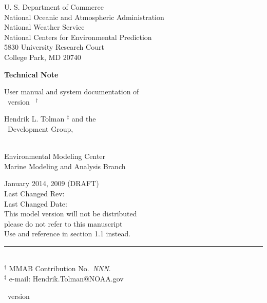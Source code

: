 
\pagestyle{empty}

\begin{center} 
U. S. Department of Commerce \\
National Oceanic and Atmospheric Administration \\
National Weather Service \\
National Centers for Environmental Prediction \\
5830 University Research Court \\
College Park, MD 20740


\vspace{15mm}

{\bf Technical Note}

\vspace{15mm}

{\large User manual and system documentation of \\
\ww\ version \WWver\ $^\dag$} \\

\vspace{15mm}

Hendrik L. Tolman $^\ddag$ and the \\
\ww\ Development Group, \\
\strut \\
Environmental Modeling Center \\
Marine Modeling and Analysis Branch

\vfill

January 2014, 2009
(DRAFT) \\
Last Changed Rev: \SVNRevision \\
Last Changed Date: \SVNDate \\
\vspace{\baselineskip}
This model version will not be distributed \\
{\sc please do not refer to this manuscript} \\
Use \cite{tol:MMAB09a} and reference in section 1.1 instead.


\vfill

\end{center}
\noindent \rule{140mm}{0.5mm} \\
{\small $^\dag$ MMAB Contribution No.~{\it NNN}. \\
$^\ddag$ e-mail: Hendrik.Tolman@NOAA.gov}

\bpage

\pb

         { \hspace{20.5mm} \ws\ version \WWver}
\pagestyle{myheadings}
\setcounter{page}{1}
\tableofcontents

\pb
\pagestyle{empty}
\bpagea

\pb
\pagestyle{myheadings}

